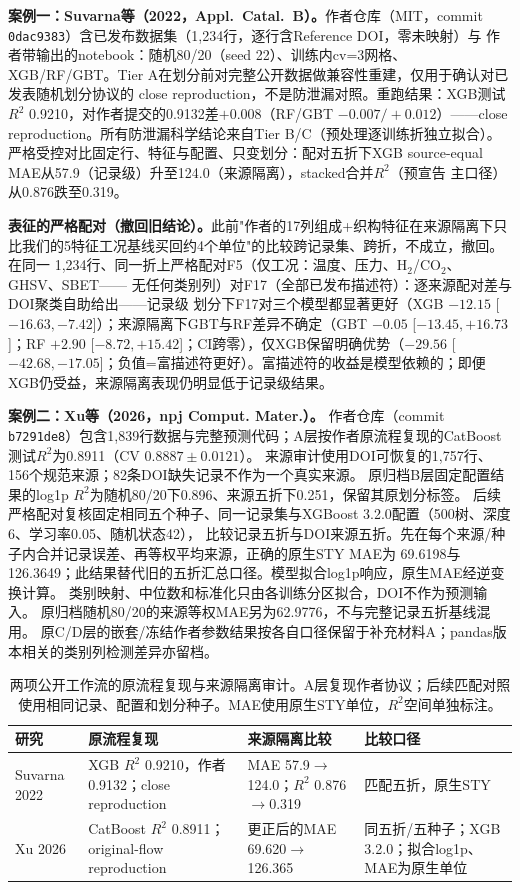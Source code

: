 \documentclass[11pt,a4paper]{article}
\begin{document}
\textbf{案例一：Suvarna等（2022，Appl.\ Catal.\ B）。}作者仓库（MIT，commit
\texttt{0dac9383}）含已发布数据集（1{,}234行，逐行含Reference DOI，零未映射）与
作者带输出的notebook：随机80/20（seed 22）、训练内cv=3网格、XGB/RF/GBT。Tier A在划分前对完整公开数据做兼容性重建，仅用于确认对已发表随机划分协议的
close reproduction，不是防泄漏对照。重跑结果：XGB测试$R^2$
0.9210，对作者提交的0.9132差$+0.008$（RF/GBT $-0.007/+0.012$）——close reproduction。所有防泄漏科学结论来自Tier B/C（预处理逐训练折独立拟合）。严格受控对比固定行、特征与配置、只变划分：配对五折下XGB
source-equal MAE从57.9（记录级）升至124.0（来源隔离），stacked合并$R^2$（预宣告
主口径）从0.876跌至0.319。

\textbf{表征的严格配对（撤回旧结论）。}此前"作者的17列组成+织构特征在来源隔离下只
比我们的5特征工况基线买回约4个单位"的比较跨记录集、跨折，不成立，撤回。在同一
1{,}234行、同一折上严格配对F5（仅工况：温度、压力、H$_2$/CO$_2$、GHSV、SBET——
无任何类别列）对F17（全部已发布描述符）：逐来源配对差与DOI聚类自助给出——记录级
划分下F17对三个模型都显著更好（XGB $-12.15$ [$-16.63,-7.42$]）；来源隔离下GBT与RF差异不确定（GBT $-0.05$ [$-13.45,+16.73$]；RF $+2.90$ [$-8.72,+15.42$]；CI跨零），仅XGB保留明确优势（$-29.56$ [$-42.68,-17.05$]；负值=富描述符更好）。富描述符的收益是模型依赖的；即便XGB仍受益，来源隔离表现仍明显低于记录级结果。

\textbf{案例二：Xu等（2026，npj Comput. Mater.）。}
作者仓库（commit \texttt{b7291de8}）包含1,839行数据与完整预测代码；A层按作者原流程复现的CatBoost测试$R^2$为0.8911（CV $0.8887\pm0.0121$）。
来源审计使用DOI可恢复的1,757行、156个规范来源；82条DOI缺失记录不作为一个真实来源。
原归档B层固定配置结果的log1p $R^2$为随机80/20下0.896、来源五折下0.251，保留其原划分标签。
后续严格配对复核固定相同五个种子、同一记录集与XGBoost 3.2.0配置（500树、深度6、学习率0.05、随机状态42），
比较记录五折与DOI来源五折。先在每个来源/种子内合并记录误差、再等权平均来源，正确的原生STY MAE为
69.6198与126.3649；此结果替代旧的五折汇总口径。模型拟合log1p响应，原生MAE经逆变换计算。
类别映射、中位数和标准化只由各训练分区拟合，DOI不作为预测输入。
原归档随机80/20的来源等权MAE另为62.9776，不与完整记录五折基线混用。
原C/D层的嵌套/冻结作者参数结果按各自口径保留于补充材料A；pandas版本相关的类别列检测差异亦留档。

\begin{table}[t]\centering\small
\caption{两项公开工作流的原流程复现与来源隔离审计。A层复现作者协议；后续匹配对照使用相同记录、配置和划分种子。MAE使用原生STY单位，$R^2$空间单独标注。}\label{tab:audit}
\begin{tabularx}{\linewidth}{lXXX}\toprule
研究 & 原流程复现 & 来源隔离比较 & 比较口径\\\midrule
Suvarna 2022 & XGB $R^2$ 0.9210，作者0.9132；close reproduction & MAE 57.9$\to$124.0；$R^2$ 0.876$\to$0.319 & 匹配五折，原生STY\\
Xu 2026 & CatBoost $R^2$ 0.8911；original-flow reproduction & 更正后的MAE 69.620$\to$126.365 & 同五折/五种子；XGB 3.2.0；拟合log1p、MAE为原生单位\\
\bottomrule\end{tabularx}\end{table}
\end{document}
